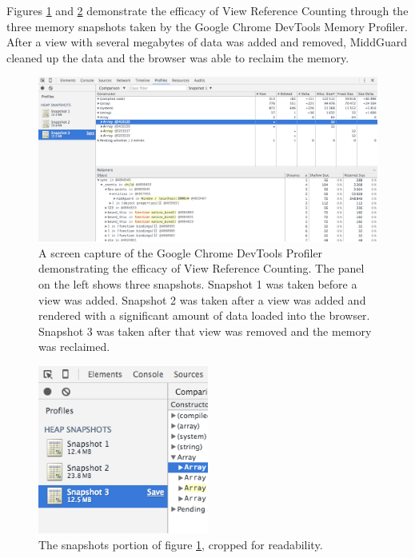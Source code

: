 \documentclass[midd]{thesis}
\begin{document}
Figures \ref{fig:vrc} and \ref{fig:vrccropped} demonstrate the efficacy of View
Reference Counting through the three memory snapshots taken by the Google Chrome
DevTools Memory Profiler. After a view with several megabytes of data was added
and removed, MiddGuard cleaned up the data and the browser was able to reclaim
the memory.

\begin{figure}[!ht]
  \centering
  \includegraphics[width=1\textwidth]{devtools-snapshot}
  \caption[Browser memory profiles with View Reference Counting.]{A screen
  capture of the Google Chrome DevTools Profiler demonstrating the efficacy of
  View Reference Counting. The panel on the left shows three snapshots. Snapshot
  1 was taken before a view was added. Snapshot 2 was taken after a view was
  added and rendered with a significant amount of data loaded into the browser.
  Snapshot 3 was taken after that view was removed and the memory was
  reclaimed.}
  \label{fig:vrc}
\end{figure}

\begin{figure}[!ht]
  \centering
  \includegraphics[width=0.5\textwidth]{devtools-snapshot-cropped}
  \caption{The snapshots portion of figure \ref{fig:vrc}, cropped for
  readability.}
  \label{fig:vrccropped}
\end{figure}
\end{document}

